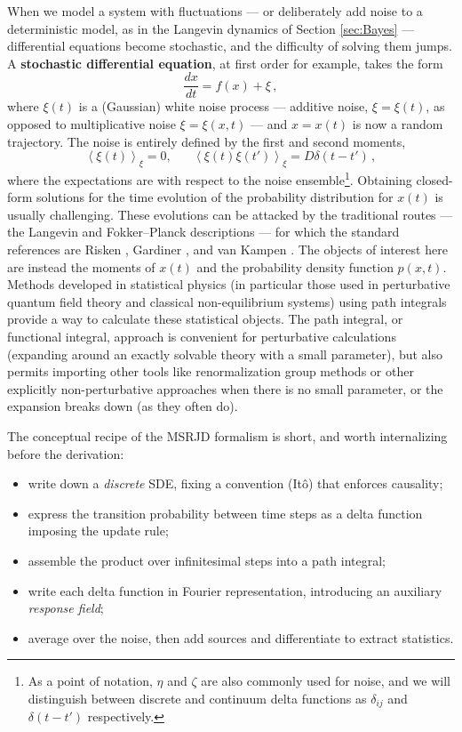 \documentclass[11pt]{article}
\newcommand{\expval}[1]{\left\langle #1 \right\rangle}
\newcommand{\dv}[2]{\frac{d #1}{d #2}}
\begin{document}
When we model a system with fluctuations --- or deliberately add noise to a deterministic model, as in the Langevin dynamics of Section \ref{sec:Bayes} --- differential equations become stochastic, and the difficulty of solving them jumps. A \textbf{stochastic differential equation}, at first order for example, takes the form
\begin{equation}
    \dv{x}{t} = f(x) + \xi\,,
\end{equation}
where $\xi(t)$ is a (Gaussian) white noise process --- additive noise, $\xi = \xi(t)$, as opposed to multiplicative noise $\xi=\xi(x,t)$ --- and $x=x(t)$ is now a random trajectory.  The noise is entirely defined by the first and second moments,
\begin{equation}
    \expval{\xi(t)}_\xi = 0, \hspace{20pt} \expval{\xi(t)\xi(t')}_\xi = D \delta(t-t')\,,
\end{equation}
where the expectations are with respect to the noise ensemble\footnote{As a point of notation, $\eta$ and $\zeta$ are also commonly used for noise, and we will distinguish between discrete and continuum delta functions as $\delta_{ij}$ and $\delta(t-t')$ respectively.}.  Obtaining closed-form solutions for the time evolution of the probability distribution for $x(t)$ is usually challenging.  These evolutions can be attacked by the traditional routes --- the Langevin and Fokker--Planck descriptions --- for which the standard references are Risken \cite{risken1996fokker}, Gardiner \cite{gardiner2004handbook}, and van Kampen \cite{vankampen2007stochastic}. The objects of interest here are instead the moments of $x(t)$ and the probability density function $p(x,t).$  Methods developed in statistical physics (in particular those used in perturbative quantum field theory and classical non-equilibrium systems) using path integrals provide a way to calculate these statistical objects.  The path integral, or functional integral, approach is convenient for perturbative calculations (expanding around an exactly solvable theory with a small parameter), but also permits importing other tools like renormalization group methods or other explicitly non-perturbative approaches when there is no small parameter, or the expansion breaks down (as they often do). 

The conceptual recipe of the MSRJD formalism is short, and worth internalizing before the derivation:
\begin{itemize}
\item write down a \emph{discrete} SDE, fixing a convention (It\^o) that enforces causality;
\item express the transition probability between time steps as a delta function imposing the update rule;
\item assemble the product over infinitesimal steps into a path integral;
\item write each delta function in Fourier representation, introducing an auxiliary \emph{response field};
\item average over the noise, then add sources and differentiate to extract statistics.
\end{itemize}
\end{document}
